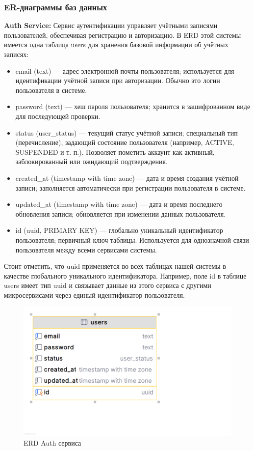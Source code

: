\subsubsection*{ER-диаграммы баз данных}
\textbf{Auth Service:} Сервис аутентификации управляет учётными записями пользователей, обеспечивая регистрацию и авторизацию. В ERD этой системы имеется одна таблица users для хранения базовой информации об учётных записях:
\begin{itemize}
    \item email (text) — адрес электронной почты пользователя; используется для идентификации учётной записи при авторизации. Обычно это логин пользователя в системе.
    \item password (text) — хеш пароля пользователя; хранится в зашифрованном виде для последующей проверки.
    \item status (user\_status) — текущий статус учётной записи; специальный тип (перечисление), задающий состояние пользователя (например, ACTIVE, SUSPENDED и т. п.). Позволяет пометить аккаунт как активный, заблокированный или ожидающий подтверждения.
    \item created\_at (timestamp with time zone) — дата и время создания учётной записи; заполняется автоматически при регистрации пользователя в системе.
    \item updated\_at (timestamp with time zone) — дата и время последнего обновления записи; обновляется при изменении данных пользователя.
    \item id (uuid, PRIMARY KEY) — глобально уникальный идентификатор пользователя; первичный ключ таблицы. Используется для однозначной связи пользователя между всеми сервисами системы.
\end{itemize}
Стоит отметить, что uuid применяется во всех таблицах нашей системы в качестве глобального уникального идентификатора. Например, поле id в таблице users имеет тип uuid и связывает данные из этого сервиса с другими микросервисами через единый идентификатор пользователя.
\begin{figure}[H]
        \centering
        \includegraphics[width=0.8\linewidth]{Images/second_chapter_backend_architecture/Picture10.png}
        \caption{ERD Auth сервиса}
        \label{fig:auth-service-erd}
\end{figure}

